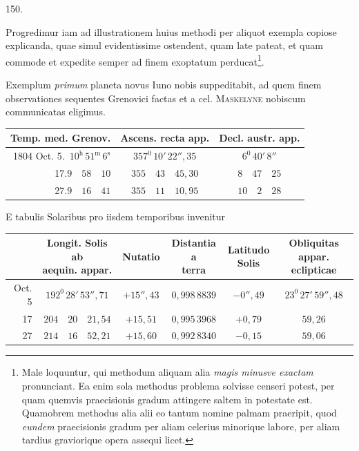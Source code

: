 \par{}\medskip
\begin{center}\hypertarget{native-200-article150}{}150.\end{center}
Progredimur iam ad illustrationem huius methodi per aliquot exempla
copiose explicanda, quae simul evidentissime ostendent, quam late pateat, et
quam commode et expedite semper ad finem exoptatum perducat\footnote{Male loquuntur, qui methodum aliquam alia \textit{magis minusve exactam} pronunciant. Ea enim sola methodus problema solvisse censeri potest, per quam quemvis praecisionis gradum attingere saltem in potestate est. Quamobrem methodus alia alii eo tantum nomine palmam praeripit, quod \textit{eundem} praecisionis gradum per aliam celerius minorique labore, per aliam tardius graviorique opera assequi licet.}.

Exemplum \textit{primum} planeta novus Iuno nobis suppeditabit, ad quem finem
observationes sequentes Grenovici factas et a cel. \textsc{Maskelyne} nobiscum communicatas
eligimus.
\begin{center}
\small\setlength{\tabcolsep}{5pt}\renewcommand{\arraystretch}{1.2}
\begin{tabular}{|r|c|c|}
\hline
Temp. med. Grenov. & Ascens. recta app. & Decl. austr. app.\\
\hline
1804 Oct. 5.\ $10^{\mathrm{h}}\,51^{\mathrm{m}}\,6^{\mathrm{s}}$ & $357^{0}\,10'\,22''{,}35$ & $6^{0}\,40'\,8''$\\
17.\quad $9\quad58\quad10$ & $355\quad43\quad45{,}30$ & $8\quad47\quad25$\\
27.\quad $9\quad16\quad41$ & $355\quad11\quad10{,}95$ & $10\quad2\quad28$\\
\hline
\end{tabular}
\end{center}

E tabulis Solaribus pro iisdem temporibus invenitur
\begin{center}
\footnotesize\setlength{\tabcolsep}{3pt}\renewcommand{\arraystretch}{1.2}
\begin{tabular}{|r|c|c|c|c|c|}
\hline
 & \shortstack{Longit. Solis ab\\aequin. appar.} & Nutatio & \shortstack{Distantia a\\terra} & \shortstack{Latitudo\\Solis} & \shortstack{Obliquitas appar.\\eclipticae}\\
\hline
Oct. 5 & $192^{0}\,28'\,53''{,}71$ & $+15''{,}43$ & $0{,}998\,8839$ & $-0''{,}49$ & $23^{0}\,27'\,59''{,}48$\\
17 & $204\quad20\quad21{,}54$ & $+15{,}51$ & $0{,}995\,3968$ & $+0{,}79$ & $59{,}26$\\
27 & $214\quad16\quad52{,}21$ & $+15{,}60$ & $0{,}992\,8340$ & $-0{,}15$ & $59{,}06$\\
\hline
\end{tabular}
\end{center}

